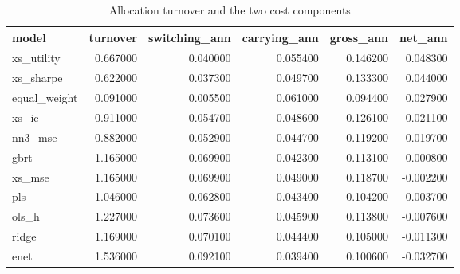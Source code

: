 \begin{table}
\caption{Allocation turnover and the two cost components}
\label{tab:t3_turnover}
\begin{tabular}{lrrrrr}
\toprule
model & turnover & switching\_ann & carrying\_ann & gross\_ann & net\_ann \\
\midrule
xs\_utility & 0.667000 & 0.040000 & 0.055400 & 0.146200 & 0.048300 \\
xs\_sharpe & 0.622000 & 0.037300 & 0.049700 & 0.133300 & 0.044000 \\
equal\_weight & 0.091000 & 0.005500 & 0.061000 & 0.094400 & 0.027900 \\
xs\_ic & 0.911000 & 0.054700 & 0.048600 & 0.126100 & 0.021100 \\
nn3\_mse & 0.882000 & 0.052900 & 0.044700 & 0.119200 & 0.019700 \\
gbrt & 1.165000 & 0.069900 & 0.042300 & 0.113100 & -0.000800 \\
xs\_mse & 1.165000 & 0.069900 & 0.049000 & 0.118700 & -0.002200 \\
pls & 1.046000 & 0.062800 & 0.043400 & 0.104200 & -0.003700 \\
ols\_h & 1.227000 & 0.073600 & 0.045900 & 0.113800 & -0.007600 \\
ridge & 1.169000 & 0.070100 & 0.044400 & 0.105000 & -0.011300 \\
enet & 1.536000 & 0.092100 & 0.039400 & 0.100600 & -0.032700 \\
\bottomrule
\end{tabular}
\end{table}
